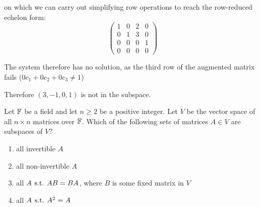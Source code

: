 \documentclass[a4paper, 10pt]{article}
\begin{document}
\begin{solution}
    on which we can carry out simplifying row operations to reach the row-reduced echelon form:
    \[
        \left(\begin{array}{ccc|c}
                1 & 0 & 2 & 0 \\
                0 & 1 & 3 & 0 \\
                0 & 0 & 0 & 1 \\
                0 & 0 & 0 & 0
            \end{array}\right)
    \]

    The system therefore has no solution, as the third row of the augmented matrix fails (\(0c_1 + 0c_2 + 0c_3 \neq 1\))

    Therefore \((3, -1, 0, 1)\) is not in the subspace.
\end{solution}

\begin{problem} 
Let \(\mathbb{F}\) be a field and let \(n \geq 2\) be a positive integer. Let \(V\) be the vector space of all \(n \times n\) matrices over \(\mathbb{F}\). Which of the following sets of matrices \(A \in V\) are subspaces of \(V\)?
\begin{enumerate}
    \item all invertible \(A\)
    \item all non-invertible \(A\)
    \item all \(A \hspace*{4pt}\text{s.t.}\hspace*{4pt} AB = BA\), where \(B\) is some fixed matrix in \(V\)
    \item all \(A \hspace*{4pt}\text{s.t.}\hspace*{4pt} A^2 = A\)
\end{enumerate}
\end{problem}
\end{document}
